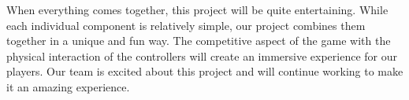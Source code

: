 \documentclass[11pt]{ieeeconf}
\begin{document}
When everything comes together, this project will be quite entertaining. While each individual component is relatively simple, our project combines them together in a unique and fun way. The competitive aspect of the game with the physical interaction of the controllers will create an immersive experience for our players. Our team is excited about this project and will continue working to make it an amazing experience.



\end{document}
